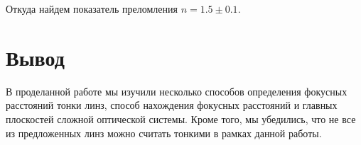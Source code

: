 \begin{enumerate}
		Откуда найдем показатель преломления $n = 1.5 \pm 0.1$.
		
		\section*{Вывод}
		
		В проделанной работе мы изучили несколько способов определения фокусных расстояний тонки линз, способ нахождения фокусных расстояний и главных плоскостей сложной оптической системы. Кроме того, мы убедились, что не все из предложенных линз можно считать тонкими в рамках данной работы.
		
	\end{enumerate}
	
